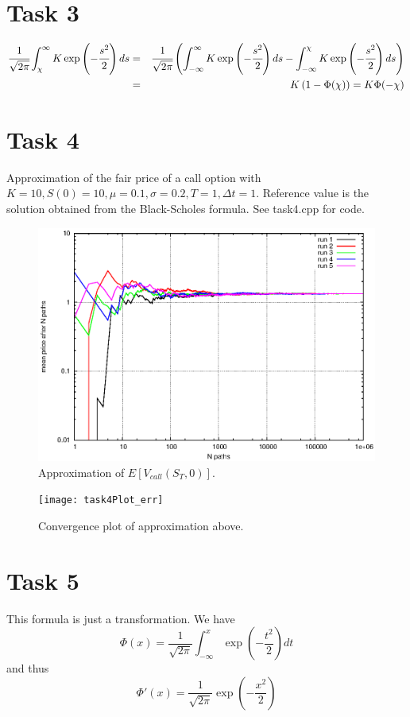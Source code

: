 \documentclass[]{article}
\begin{document}
\section*{Task 3}
\begin{eqnarray*}
\cfrac{1}{\sqrt{2\pi}}\int_{\chi}^{\infty}K\exp\left(-\cfrac{s^2}{2}\right)ds &
= & \cfrac{1}{\sqrt{2\pi}}\left(\int_{-\infty}^{\infty}K\exp\left(-\cfrac{s^2}{2}\right)ds
- \int_{-\infty}^{\chi}K\exp\left(-\cfrac{s^2}{2}\right)ds \right) \\
& = & K\left(1 - \Phi(\chi)\right) = K \Phi(-\chi)
\end{eqnarray*}

\section*{Task 4}
Approximation of the fair price of a call option with $K=10,S(0)=10,\mu=0.1,\sigma=0.2,T=1,\Delta t=1$. Reference value is the solution obtained from the Black-Scholes formula. See task4.cpp for code. 
\begin{figure}[!ht]
\centering
\includegraphics{task4Plot}
\caption{Approximation of $E\left[V_{call}(S_T,0)\right]$.}
\label{fig:Task4a}
\end{figure}
\begin{figure}[!ht]
\centering
\texttt{[image: task4Plot\_err]}
\caption{Convergence plot of approximation above.}
\label{fig:Task4b}
\end{figure}
\clearpage

\section*{Task 5} This formula is just a transformation. We have
\[\Phi(x)=\dfrac{1}{\sqrt{2\pi}}\int_{-\infty}^x
\exp\left({-\dfrac{t^2}{2}}\right)dt\] 
and thus
\[\Phi'(x)=\dfrac{1}{\sqrt{2\pi}}\exp\left({-\dfrac{x^2}{2}}\right)\]
\end{document}
